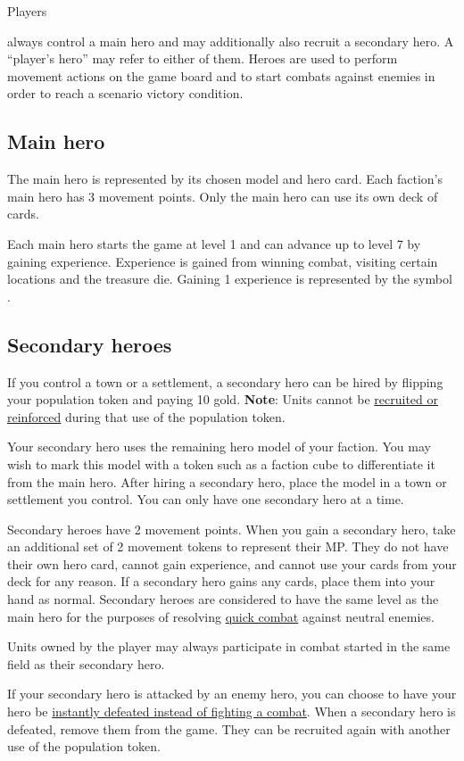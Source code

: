 \hypertarget{Heroes}{Players} always control a main hero and may additionally also recruit a secondary hero.
A “player’s hero” may refer to either of them.
Heroes are used to perform movement actions on the game board and to start combats against enemies in order to reach a scenario victory condition.

\subsection*{Main hero}
The main hero is represented by its chosen model and hero card.
Each faction’s main hero has 3 movement points.
Only the main hero can use its own deck of cards.\par
Each main hero starts the game at level 1 and can advance up to level 7 by gaining experience.
Experience is gained from winning combat, visiting certain locations and the treasure die.
Gaining 1 experience is represented by the symbol .

\subsection*{\hypertarget{Secondary}{Secondary heroes}}
If you control a town or a settlement, a secondary hero can be hired by flipping your population token and paying 10 gold.
\textbf{Note}: Units cannot be \hyperlink{Units}{recruited or reinforced} during that use of the population token.\par
Your secondary hero uses the remaining hero model of your faction.
You may wish to mark this model with a token such as a faction cube to differentiate it from the main hero.
After hiring a secondary hero, place the model in a town or settlement you control.
You can only have one secondary hero at a time.\par
Secondary heroes have 2 movement points.
When you gain a secondary hero, take an additional set of 2 movement tokens to represent their MP.
They do not have their own hero card, cannot gain experience, and cannot use your cards from your deck for any reason.
If a secondary hero gains any cards, place them into your hand as normal.
Secondary heroes are considered to have the same level as the main hero for the purposes of resolving \hyperlink{Quick}{quick combat} against neutral enemies.\par
Units owned by the player may always participate in combat started in the same field as their secondary hero.\par
If your secondary hero is attacked by an enemy hero, you can choose to have your hero be \hyperlink{Endcombat}{instantly defeated instead of fighting a combat}.
When a secondary hero is defeated, remove them from the game.
They can be recruited again with another use of the population token.\par

